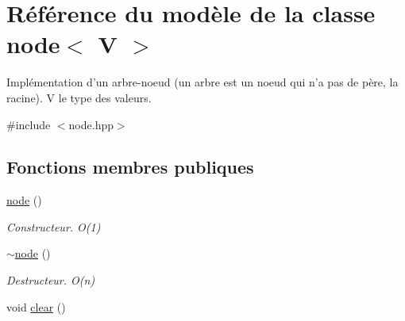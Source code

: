 \hypertarget{classnode}{\section{Référence du modèle de la classe node$<$ V $>$}
\label{classnode}
}


Implémentation d'un arbre-\/noeud (un arbre est un noeud qui n'a pas de père, la racine). V le type des valeurs.  




{\ttfamily \#include $<$node.\-hpp$>$}

\subsection*{Fonctions membres publiques}
\begin{DoxyCompactItemize}
\item 
\hypertarget{classnode_a6aa89aa05eab66d2543011b766e88de9}{\hyperlink{classnode_a6aa89aa05eab66d2543011b766e88de9}{node} ()}\label{classnode_a6aa89aa05eab66d2543011b766e88de9}

\begin{DoxyCompactList}\small\item\em Constructeur. O(1) \end{DoxyCompactList}\item 
\hypertarget{classnode_a49036848ebd67573c4661beae16ec905}{\hyperlink{classnode_a49036848ebd67573c4661beae16ec905}{$\sim$node} ()}\label{classnode_a49036848ebd67573c4661beae16ec905}

\begin{DoxyCompactList}\small\item\em Destructeur. O(n) \end{DoxyCompactList}\item 
\hypertarget{classnode_a7f81051f500c7c8ae46cc22689fc18eb}{void \hyperlink{classnode_a7f81051f500c7c8ae46cc22689fc18eb}{clear} ()}\label{classnode_a7f81051f500c7c8ae46cc22689fc18eb}


\end{DoxyCompactItemize}
